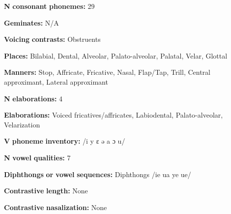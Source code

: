 \begin{styleBody}
\textbf{N} \textbf{consonant} \textbf{phonemes:} 29
\end{styleBody}

\begin{styleBody}
\textbf{Geminates:} N/A
\end{styleBody}

\begin{styleBody}
\textbf{Voicing} \textbf{contrasts:} Obstruents
\end{styleBody}

\begin{styleBody}
\textbf{Places:} Bilabial, Dental, Alveolar, Palato-alveolar, Palatal, Velar, Glottal
\end{styleBody}

\begin{styleBody}
\textbf{Manners:} Stop, Affricate, Fricative, Nasal, Flap/Tap, Trill, Central approximant, Lateral approximant
\end{styleBody}

\begin{styleBody}
\textbf{N} \textbf{elaborations:} 4
\end{styleBody}

\begin{styleBody}
\textbf{Elaborations:} Voiced fricatives/affricates, Labiodental, Palato-alveolar, Velarization
\end{styleBody}

\begin{styleBody}
\textbf{V} \textbf{phoneme} \textbf{inventory:} /i y ɛ ə a ɔ u/
\end{styleBody}

\begin{styleBody}
\textbf{N} \textbf{vowel} \textbf{qualities:} 7
\end{styleBody}

\begin{styleBody}
\textbf{Diphthongs} \textbf{or} \textbf{vowel} \textbf{sequences:} Diphthongs /ie ua ye ue/
\end{styleBody}

\begin{styleBody}
\textbf{Contrastive} \textbf{length:} None
\end{styleBody}

\begin{styleBody}
\textbf{Contrastive} \textbf{nasalization:} None
\end{styleBody}

